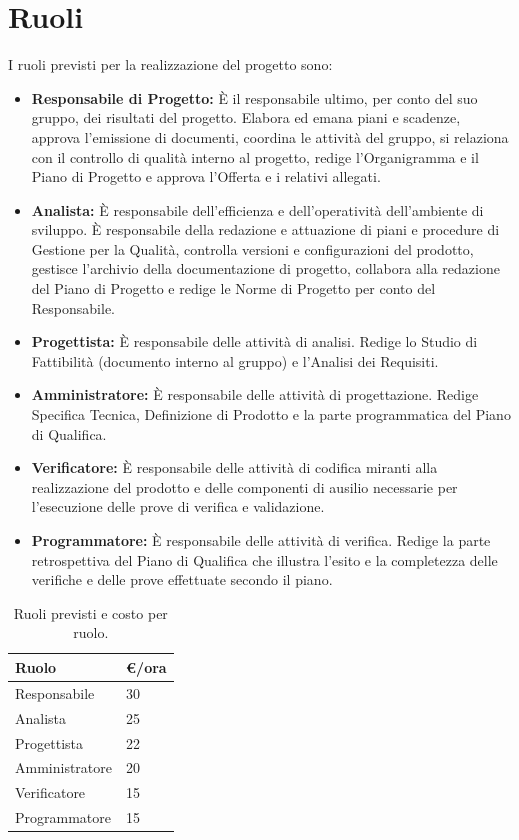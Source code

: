 \section{Ruoli}

I ruoli previsti per la realizzazione del progetto sono:

\begin{itemize}
	\item \textbf{Responsabile di Progetto:} È il responsabile ultimo, per conto del suo gruppo, dei risultati del progetto.
Elabora ed emana piani e scadenze, approva l'emissione di documenti, coordina le attività del gruppo, si relaziona con il controllo di qualità interno al progetto, redige l'Organigramma e il Piano di Progetto e approva l'Offerta e i relativi allegati.
	\item \textbf{Analista:} È responsabile dell'efficienza e dell'operatività dell'ambiente di sviluppo. 
È responsabile della redazione e attuazione di piani e procedure di Gestione per la Qualità, controlla versioni e configurazioni del prodotto, gestisce l'archivio della documentazione di progetto, collabora alla redazione del Piano di Progetto e redige le Norme di Progetto per conto del Responsabile.
	\item \textbf{Progettista:} È responsabile delle attività di analisi. 
Redige lo Studio di Fattibilità (documento interno al gruppo) e l'Analisi dei Requisiti.
	\item \textbf{Amministratore:} È responsabile delle attività di progettazione. 
Redige Specifica Tecnica, Definizione di Prodotto e la parte programmatica del Piano di Qualifica.
	\item \textbf{Verificatore:} È responsabile delle attività di codifica miranti alla realizzazione del prodotto e delle componenti di ausilio necessarie per l'esecuzione delle prove di verifica e validazione.
	\item \textbf{Programmatore:} È responsabile delle attività di verifica.
Redige la parte retrospettiva del Piano di Qualifica che illustra l'esito e la completezza delle verifiche e delle prove effettuate secondo il piano.
\end{itemize}

\begin{table}[h]
\begin{center}
\begin{tabular}{|l|l|}
\hline
\textbf{Ruolo} & \textbf{€/ora} \\
\hline
Responsabile & 30 \\
Analista & 25 \\
Progettista & 22 \\
Amministratore & 20 \\
Verificatore & 15 \\
Programmatore & 15 \\
\hline
\end{tabular}
\caption{Ruoli previsti e costo per ruolo.}
\end{center}
\end{table}

